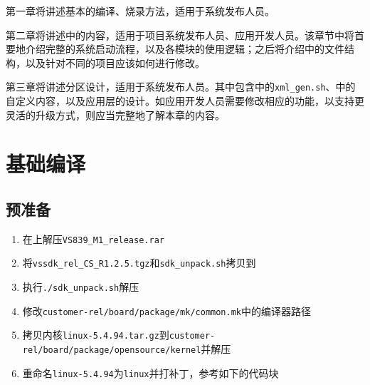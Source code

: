 \documentclass[UTF8]{ctexart}
\newcommand{\code}[1]{\colorbox{gray!10}{\lstinline[style=inlinecode]|#1|}}
\begin{document}
第一章将讲述基本的编译、烧录方法，适用于系统发布人员。

第二章将讲述中的内容，适用于项目系统发布人员、应用开发人员。该章节中将首要地介绍完整的系统启动流程，以及各模块的使用逻辑；之后将介绍中的文件结构，以及针对不同的项目应该如何进行修改。

第三章将讲述分区设计，适用于系统发布人员。其中包含中的\code{xml_gen.sh}、中的自定义内容，以及应用层的设计。如应用开发人员需要修改相应的功能，以支持更灵活的升级方式，则应当完整地了解本章的内容。

\newpage

\renewcommand{\contentsname}{目录}
\tableofcontents
\newpage



\section{基础编译}

\subsection{预准备}

\begin{enumerate}
    \item 在上解压\code{VS839_M1_release.rar}
    \item 将\code{vssdk_rel_CS_R1.2.5.tgz}和\code{sdk_unpack.sh}拷贝到
    \item 执行\code{./sdk_unpack.sh}解压
    \item 修改\code{customer-rel/board/package/mk/common.mk}中的编译器路径
    \item 拷贝内核\code{linux-5.4.94.tar.gz}到\code{customer-rel/board/package/opensource/kernel}并解压
    \item 重命名\code{linux-5.4.94}为\code{linux}并打补丁，参考如下的代码块
\end{enumerate}
\end{document}
